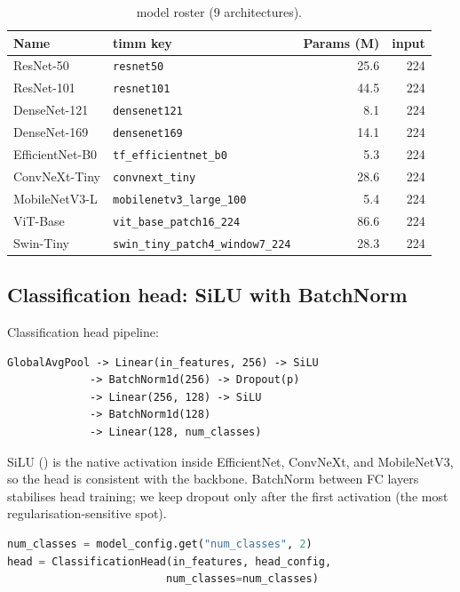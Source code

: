 \documentclass[10pt,a4paper]{article}
\begin{document}
\begin{table}[ht]
  \centering
  \small
  \begin{tabular}{llrr}
    \toprule
    Name & timm key & Params (M) & input \\
    \midrule
    ResNet-50        & \texttt{resnet50}                   & 25.6 & 224 \\
    ResNet-101       & \texttt{resnet101}                  & 44.5 & 224 \\
    DenseNet-121     & \texttt{densenet121}                &  8.1 & 224 \\
    DenseNet-169     & \texttt{densenet169}                & 14.1 & 224 \\
    EfficientNet-B0  & \texttt{tf\_efficientnet\_b0}      &  5.3 & 224 \\
    ConvNeXt-Tiny    & \texttt{convnext\_tiny}             & 28.6 & 224 \\
    MobileNetV3-L    & \texttt{mobilenetv3\_large\_100}    &  5.4 & 224 \\
    ViT-Base         & \texttt{vit\_base\_patch16\_224}    & 86.6 & 224 \\
    Swin-Tiny        & \texttt{swin\_tiny\_patch4\_window7\_224} & 28.3 & 224 \\
    \bottomrule
  \end{tabular}
  \caption{model roster (9 architectures).}
  \label{tab:models}
\end{table}

\subsection{Classification head: SiLU with BatchNorm}

Classification head pipeline:

\begin{verbatim}
GlobalAvgPool -> Linear(in_features, 256) -> SiLU
             -> BatchNorm1d(256) -> Dropout(p)
             -> Linear(256, 128) -> SiLU
             -> BatchNorm1d(128)
             -> Linear(128, num_classes)
\end{verbatim}

SiLU (\cite{elfwing:2018}) is the native activation inside EfficientNet,
ConvNeXt, and MobileNetV3, so the head is consistent with the
backbone. BatchNorm between FC layers stabilises head training; we
keep dropout only after the first activation (the most
regularisation-sensitive spot).

\begin{lstlisting}[language=Python, basicstyle=\ttfamily\small]
num_classes = model_config.get("num_classes", 2)
head = ClassificationHead(in_features, head_config,
                         num_classes=num_classes)
\end{lstlisting}
\end{document}

